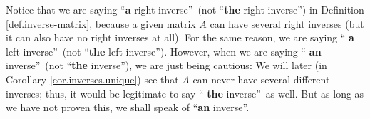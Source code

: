 \documentclass[numbers=enddot,12pt,final,onecolumn,notitlepage]{scrartcl}%
\theoremstyle{definition}
\begin{document}
Notice that we are saying \textquotedblleft\textbf{a} right
inverse\textquotedblright\ (not \textquotedblleft\textbf{the} right
inverse\textquotedblright) in Definition \ref{def.inverse-matrix}, because a
given matrix $A$ can have several right inverses (but it can also have no
right inverses at all). For the same reason, we are saying \textquotedblleft%
\textbf{a} left inverse\textquotedblright\ (not \textquotedblleft\textbf{the}
left inverse\textquotedblright). However, when we are saying \textquotedblleft%
\textbf{an} inverse\textquotedblright\ (not \textquotedblleft\textbf{the}
inverse\textquotedblright), we are just being cautious: We will later (in
Corollary \ref{cor.inverses.unique}) see that $A$ can never have several
different inverses; thus, it would be legitimate to say \textquotedblleft%
\textbf{the} inverse\textquotedblright\ as well. But as long as we have not
proven this, we shall speak of \textquotedblleft\textbf{an}
inverse\textquotedblright.
\end{document}
